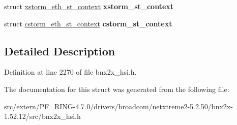 \begin{DoxyCompactItemize}
\item 
\hypertarget{structeth__context_a2b076e91afe9448f75d9108df375258d}{
struct \hyperlink{structxstorm__eth__st__context}{xstorm\_\-eth\_\-st\_\-context} {\bfseries xstorm\_\-st\_\-context}}
\label{structeth__context_a2b076e91afe9448f75d9108df375258d}

\item 
\hypertarget{structeth__context_ab2db657b9b6c9a0c6f477abdb771422d}{
struct \hyperlink{structcstorm__eth__st__context}{cstorm\_\-eth\_\-st\_\-context} {\bfseries cstorm\_\-st\_\-context}}
\label{structeth__context_ab2db657b9b6c9a0c6f477abdb771422d}

\end{DoxyCompactItemize}


\subsection{Detailed Description}


Definition at line 2270 of file bnx2x\_\-hsi.h.



The documentation for this struct was generated from the following file:\begin{DoxyCompactItemize}
\item 
src/extern/PF\_\-RING-\/4.7.0/drivers/broadcom/netxtreme2-\/5.2.50/bnx2x-\/1.52.12/src/bnx2x\_\-hsi.h\end{DoxyCompactItemize}
